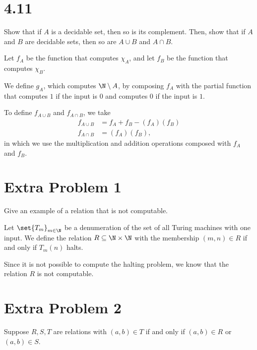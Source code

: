 \documentclass[10pt]{mypackage}
\begin{document}
\RaggedRight
\section{4.11}%
\begin{problem}
  Show that if $A$ is a decidable set, then so is its complement. Then, show that if $A$ and $B$ are decidable sets, then so are $A\cup B$ and $A\cap B$.
\end{problem}
\begin{solution}
  Let $f_A$ be the function that computes $\chi_A$, and let $f_B$ be the function that computes $\chi_B$.\newline

  We define $g_A$, which computes $\N\setminus A$, by composing $f_A$ with the partial function that computes $1$ if the input is $0$ and computes $0$ if the input is $1$.\newline

  To define $f_{A\cup B}$ and $f_{A\cap B}$, we take
  \begin{align*}
    f_{A\cup B} &= f_A + f_B - \left(f_A\right)\left(f_B\right)\\
    f_{A\cap B} &= \left(f_A\right)\left(f_B\right),
  \end{align*}
  in which we use the multiplication and addition operations composed with $f_A$ and $f_B$.
\end{solution}
\section{Extra Problem 1}%
\begin{problem}
  Give an example of a relation that is not computable.
\end{problem}
\begin{solution}
  Let $\set{T_m}_{m\in\N}$ be a denumeration of the set of all Turing machines with one input. We define the relation $R\subseteq \N\times \N$ with the membership $\left(m,n\right)\in R$ if and only if $T_{m}\left(n\right)$ halts.\newline

  Since it is not possible to compute the halting problem, we know that the relation $R$ is not computable.
\end{solution}
\section{Extra Problem 2}%
\begin{problem}
  Suppose $R,S,T$ are relations with $\left(a,b\right)\in T$ if and only if $\left(a,b\right)\in R$ or $\left(a,b\right)\in S$.
\end{problem}
\end{document}
